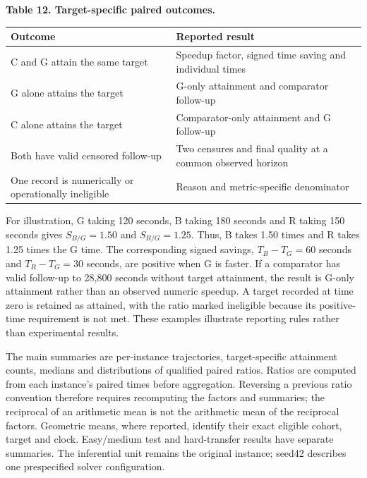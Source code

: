 \documentclass[
  british,
  10pt,
]{article}
\newcounter{none} %
\begin{document}

\textbf{Table 12. Target-specific paired outcomes.}

{\def\LTcaptype{none} %
\begin{longtable}[]{@{}
  >{\raggedright\arraybackslash}p{}
  >{\raggedright\arraybackslash}p{}@{}}
\toprule\noalign{}
\begin{minipage}[b]{\linewidth}\raggedright
Outcome
\end{minipage} & \begin{minipage}[b]{\linewidth}\raggedright
Reported result
\end{minipage} \\
\midrule\noalign{}
\endhead
\bottomrule\noalign{}
\endlastfoot
C and G attain the same target & Speedup factor, signed time saving and
individual times \\
G alone attains the target & G-only attainment and comparator
follow-up \\
C alone attains the target & Comparator-only attainment and G
follow-up \\
Both have valid censored follow-up & Two censures and final quality at a
common observed horizon \\
One record is numerically or operationally ineligible & Reason and
metric-specific denominator \\
\end{longtable}
}

For illustration, G taking 120 seconds, B taking 180 seconds and R
taking 150 seconds gives \(S_{B/G}=1.50\) and \(S_{R/G}=1.25\). Thus, B
takes 1.50 times and R takes 1.25 times the G time. The corresponding
signed savings, \(T_B-T_G=60\) seconds and \(T_R-T_G=30\) seconds, are
positive when G is faster. If a comparator has valid follow-up to 28,800
seconds without target attainment, the result is G-only attainment
rather than an observed numeric speedup. A target recorded at time zero
is retained as attained, with the ratio marked ineligible because its
positive-time requirement is not met. These examples illustrate
reporting rules rather than experimental results.

The main summaries are per-instance trajectories, target-specific
attainment counts, medians and distributions of qualified paired ratios.
Ratios are computed from each instance's paired times before
aggregation. Reversing a previous ratio convention therefore requires
recomputing the factors and summaries; the reciprocal of an arithmetic
mean is not the arithmetic mean of the reciprocal factors. Geometric
means, where reported, identify their exact eligible cohort, target and
clock. Easy/medium test and hard-transfer results have separate
summaries. The inferential unit remains the original instance; seed42
describes one prespecified solver configuration.
\end{document}
